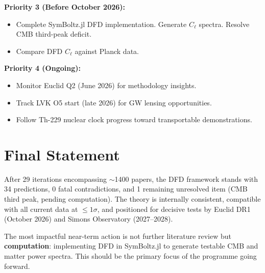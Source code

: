 \documentclass[11pt,a4paper]{article}
\begin{document}
\textbf{Priority 3 (Before October 2026):}
\begin{itemize}
\item Complete SymBoltz.jl DFD implementation. Generate $C_\ell$ spectra. Resolve CMB third-peak deficit.
\item Compare DFD $C_\ell$ against Planck data.
\end{itemize}

\textbf{Priority 4 (Ongoing):}
\begin{itemize}
\item Monitor Euclid Q2 (June 2026) for methodology insights.
\item Track LVK O5 start (late 2026) for GW lensing opportunities.
\item Follow Th-229 nuclear clock progress toward transportable demonstrations.
\end{itemize}

\section{Final Statement}

After 29 iterations encompassing $\sim$1400 papers, the DFD framework stands with 34 predictions, 0 fatal contradictions, and 1 remaining unresolved item (CMB third peak, pending computation). The theory is internally consistent, compatible with all current data at $\leq 1\sigma$, and positioned for decisive tests by Euclid DR1 (October 2026) and Simons Observatory (2027--2028).

The most impactful near-term action is not further literature review but \textbf{computation}: implementing DFD in SymBoltz.jl to generate testable CMB and matter power spectra. This should be the primary focus of the programme going forward.
\end{document}
